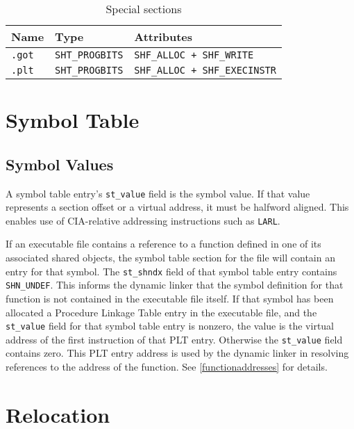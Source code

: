 \documentclass[english,11pt,twoside,toc=bib,toc=idx]{scrreprt}
\newenvironment{DIFnomarkup}{}{} %
\begin{document}
\begin{table}
  \centering
  \begin{DIFnomarkup}
  \begin{tabular}{lll}
    \toprule
    Name & Type & Attributes \\
    \midrule
    \texttt{.got} & \texttt{SHT\_PROGBITS} &
    \texttt{SHF\_ALLOC + SHF\_WRITE} \\
    \texttt{.plt} & \texttt{SHT\_PROGBITS} &
    \texttt{SHF\_ALLOC + SHF\_EXECINSTR} \\
    \bottomrule
  \end{tabular}
  \end{DIFnomarkup}
  \caption{Special sections}
  \label{tab:sections}
\end{table}

\section{Symbol Table}
\subsection{Symbol Values}
\label{symbolvalues}
A symbol table entry's \texttt{st\_value} field is the symbol value.  If
that value represents a section offset or a virtual address, it must be
halfword aligned.  This enables use of CIA-relative addressing
instructions such as \texttt{LARL}.

If an executable file contains a reference to a function defined in
one of its associated shared objects, the symbol table section for the
file will contain an entry for that symbol.  The \texttt{st\_shndx}
field of that symbol table entry contains \texttt{SHN\_UNDEF}.  This
informs the dynamic linker that the symbol definition for that
function is not contained in the executable file itself.  If that
symbol has been allocated a Procedure Linkage Table entry in the
executable file, and the \texttt{st\_value} field for that symbol
table entry is nonzero, the value is the virtual address of the first
instruction of that PLT entry.  Otherwise the \texttt{st\_value} field
contains zero.  This PLT entry address is used by the dynamic linker
in resolving references to the address of the function.  See
\cref{functionaddresses} for details.

\section{Relocation}
\end{document}
